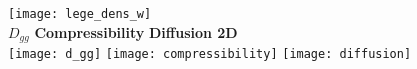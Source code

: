 \documentclass[journal=acsnano,manuscript=article]{achemso}
\begin{document}
\begin{figure}[h!]
	\centering
	 \texttt{[image: lege\_dens\_w]} \\
	 \textbf{\(D_{gg}\)}  \quad \quad \quad  \quad \quad \quad  \quad \quad \quad \textbf{Compressibility} \quad \quad \quad \quad \quad \textbf{Diffusion 2D}   \\
	\texttt{[image: d\_gg]} 
	\texttt{[image: compressibility]} 
	\texttt{[image: diffusion]} 
	\label{fig:gr_9extra}
\end{figure}

\setlength{\fboxsep}{0.75pt}%
\setlength{\fboxrule}{1.2pt}%
\end{document}
